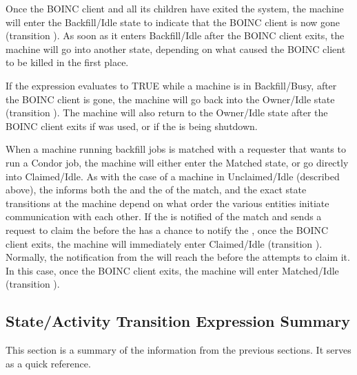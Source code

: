 Once the BOINC client and all its children have exited the system, the
machine will enter the Backfill/Idle state to indicate that the BOINC
client is now gone (transition ).
As soon as it enters Backfill/Idle after the BOINC client exits, the
machine will go into another state, depending on what caused the BOINC
client to be killed in the first place.

If the  expression evaluates to TRUE while a
machine is in Backfill/Busy, after the BOINC client is gone, the
machine will go back into the Owner/Idle state (transition
).
The machine will also return to the Owner/Idle state after the BOINC
client exits if  was used, or if the  is
being shutdown.

When a machine running backfill jobs is matched with a requester that
wants to run a Condor job, the machine will either enter the Matched
state, or go directly into Claimed/Idle.
As with the case of a machine in Unclaimed/Idle (described above), the
 informs both the  and the
 of the match, and the exact state transitions at the
machine depend on what order the various entities initiate
communication with each other.
If the  is notified of the match and sends a request to
claim the  before the  has a chance
to notify the , once the BOINC client exits, the
machine will immediately enter Claimed/Idle (transition ).
Normally, the notification from the  will reach the
 before the  attempts to claim it.
In this case, once the BOINC client exits, the machine will enter
Matched/Idle (transition ).


\subsection{\label{sec:State-Expression-Summary}
State/Activity Transition Expression Summary}
This section is a summary of the information from the
previous sections.
It serves as a quick reference.


